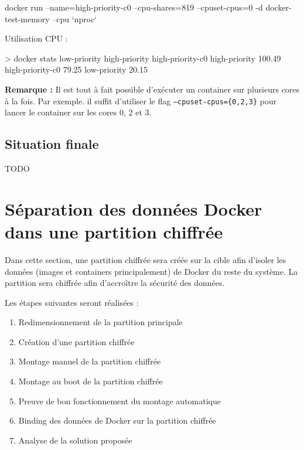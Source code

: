 \documentclass[11pt,a4paper,oneside]{report}
\newcommand{\code}[1]{\texttt{#1}}
\begin{document}
\begin{textcode}
docker run --name=high-priority-c0 --cpu-shares=819 --cpuset-cpus=0 -d docker-test-memory --cpu `nproc`
\end{textcode}

Utilisation CPU :
\begin{textcode}
> docker stats low-priority high-priority high-priority-c0
high-priority       100.49%
high-priority-c0    79.25%
low-priority        20.15%
\end{textcode}

\textbf{Remarque :} Il est tout à fait possible d'exécuter un container sur plusieurs cores à la fois. Par exemple. il suffit d'utiliser le flag \code{--cpuset-cpus=\{0,2,3\}} pour lancer le container sur les cores 0, 2 et 3.


\subsection{Situation finale}
TODO


\section{Séparation des données Docker dans une partition chiffrée}\label{partition_chiffree}
Dans cette section, une partition chiffrée sera créée sur la cible afin d'isoler les données (images et containers principalement) de Docker du reste du système. La partition sera chiffrée afin d'accroître la sécurité des données.

Les étapes suivantes seront réalisées :
\begin{enumerate}
\item Redimensionnement de la partition principale
\item Création d'une partition chiffrée
\item Montage manuel de la partition chiffrée
\item Montage au boot de la partition chiffrée
\item Preuve de bon fonctionnement du montage automatique
\item Binding des données de Docker sur la partition chiffrée
\item Analyse de la solution proposée
\end{enumerate}
\end{document}
